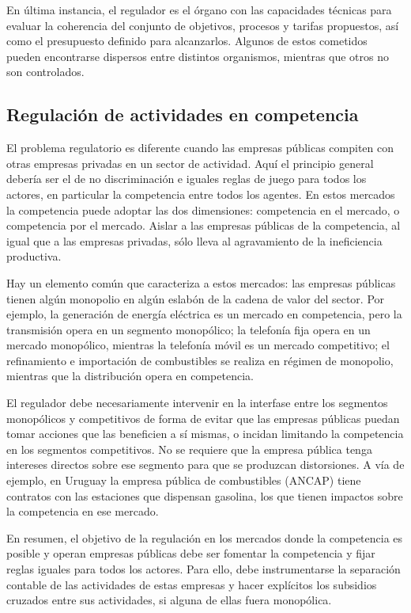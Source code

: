 \documentclass[
  12pt,
  spanish,
]{book}
\begin{document}
En última instancia, el regulador es el órgano con las capacidades
técnicas para evaluar la coherencia del conjunto de objetivos, procesos
y tarifas propuestos, así como el presupuesto definido para alcanzarlos.
Algunos de estos cometidos pueden encontrarse dispersos entre distintos
organismos, mientras que otros no son controlados.

\hypertarget{regulaciuxf3n-de-actividades-en-competencia}{%
\subsection{Regulación de actividades en
competencia}\label{regulaciuxf3n-de-actividades-en-competencia}}

El problema regulatorio es diferente cuando las empresas públicas
compiten con otras empresas privadas en un sector de actividad. Aquí el
principio general debería ser el de no discriminación e iguales reglas
de juego para todos los actores, en particular la competencia entre
todos los agentes. En estos mercados la competencia puede adoptar las
dos dimensiones: competencia en el mercado, o competencia por el
mercado. Aislar a las empresas públicas de la competencia, al igual que
a las empresas privadas, sólo lleva al agravamiento de la ineficiencia
productiva.

Hay un elemento común que caracteriza a estos mercados: las empresas
públicas tienen algún monopolio en algún eslabón de la cadena de valor
del sector. Por ejemplo, la generación de energía eléctrica es un
mercado en competencia, pero la transmisión opera en un segmento
monopólico; la telefonía fija opera en un mercado monopólico, mientras
la telefonía móvil es un mercado competitivo; el refinamiento e
importación de combustibles se realiza en régimen de monopolio, mientras
que la distribución opera en competencia.

El regulador debe necesariamente intervenir en la interfase entre los
segmentos monopólicos y competitivos de forma de evitar que las empresas
públicas puedan tomar acciones que las beneficien a sí mismas, o incidan
limitando la competencia en los segmentos competitivos. No se requiere
que la empresa pública tenga intereses directos sobre ese segmento para
que se produzcan distorsiones. A vía de ejemplo, en Uruguay la empresa
pública de combustibles (ANCAP) tiene contratos con las estaciones que
dispensan gasolina, los que tienen impactos sobre la competencia en ese
mercado.

En resumen, el objetivo de la regulación en los mercados donde la
competencia es posible y operan empresas públicas debe ser fomentar la
competencia y fijar reglas iguales para todos los actores. Para ello,
debe instrumentarse la separación contable de las actividades de estas
empresas y hacer explícitos los subsidios cruzados entre sus
actividades, si alguna de ellas fuera monopólica.
\end{document}
